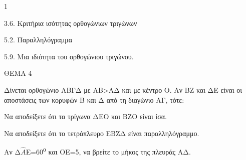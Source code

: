 \begin{ylh}{1}
    \item 3.6. Κριτήρια ισότητας ορθογώνιων τριγώνων
    \item 5.2. Παραλληλόγραμμα
    \item 5.9. Μια ιδιότητα του ορθογώνιου τριγώνου.
\end{ylh}

ΘΕΜΑ 4

Δίνεται ορθογώνιο ΑΒΓΔ με ΑΒ\textgreater ΑΔ και με κέντρο Ο. Αν ΒΖ και ΔΕ είναι οι αποστάσεις των κορυφών Β και Δ από τη διαγώνιο ΑΓ, τότε:

\begin{alist}
\item Να αποδείξετε ότι τα τρίγωνα ΔΕΟ και ΒΖΟ είναι ίσα. 

\item Να αποδείξετε ότι το τετράπλευρο ΕΒΖΔ είναι παραλληλόγραμμο. 

\item Αν Δ$\widehat{Α}$Ε=60\textsuperscript{ο} και ΟΕ=5, να βρείτε το μήκος της πλευράς ΑΔ. 


\begin{center}
\end{center}
\end{alist}
